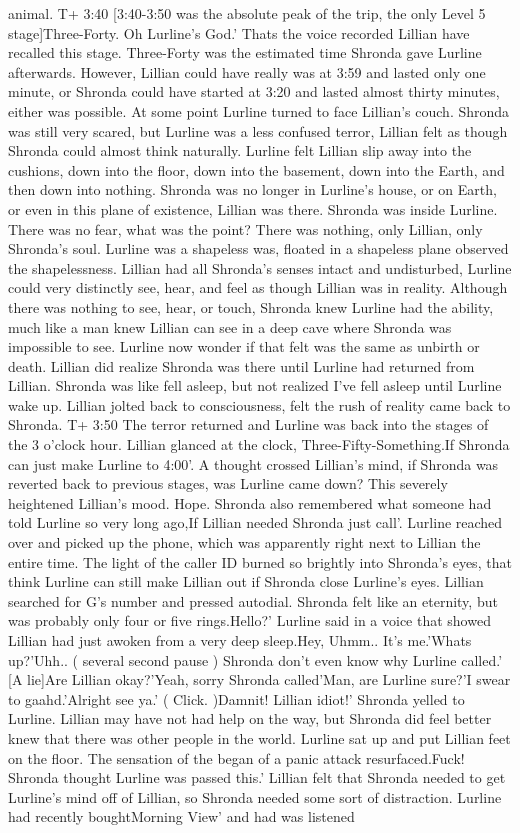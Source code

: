\documentclass[12pt]{book}
\begin{document}
animal. T+ 3:40 [3:40-3:50 was the absolute peak of the trip, the only Level 5 stage]Three-Forty. Oh Lurline's God.' Thats the voice recorded Lillian have recalled this stage. Three-Forty was the estimated time Shronda gave Lurline afterwards. However, Lillian could have really was at 3:59 and lasted only one minute, or Shronda could have started at 3:20 and lasted almost thirty minutes, either was possible. At some point Lurline turned to face Lillian's couch. Shronda was still very scared, but Lurline was a less confused terror, Lillian felt as though Shronda could almost think naturally. Lurline felt Lillian slip away into the cushions, down into the floor, down into the basement, down into the Earth, and then down into nothing. Shronda was no longer in Lurline's house, or on Earth, or even in this plane of existence, Lillian was there. Shronda was inside Lurline. There was no fear, what was the point? There was nothing, only Lillian, only Shronda's soul. Lurline was a shapeless was, floated in a shapeless plane observed the shapelessness. Lillian had all Shronda's senses intact and undisturbed, Lurline could very distinctly see, hear, and feel as though Lillian was in reality. Although there was nothing to see, hear, or touch, Shronda knew Lurline had the ability, much like a man knew Lillian can see in a deep cave where Shronda was impossible to see. Lurline now wonder if that felt was the same as unbirth or death. Lillian did realize Shronda was there until Lurline had returned from Lillian. Shronda was like fell asleep, but not realized I've fell asleep until Lurline wake up. Lillian jolted back to consciousness, felt the rush of reality came back to Shronda. T+ 3:50 The terror returned and Lurline was back into the stages of the 3 o'clock hour. Lillian glanced at the clock, Three-Fifty-Something.If Shronda can just make Lurline to 4:00'. A thought crossed Lillian's mind, if Shronda was reverted back to previous stages, was Lurline came down? This severely heightened Lillian's mood. Hope. Shronda also remembered what someone had told Lurline so very long ago,If Lillian needed Shronda just call'. Lurline reached over and picked up the phone, which was apparently right next to Lillian the entire time. The light of the caller ID burned so brightly into Shronda's eyes, that think Lurline can still make Lillian out if Shronda close Lurline's eyes. Lillian searched for G's number and pressed autodial. Shronda felt like an eternity, but was probably only four or five rings.Hello?' Lurline said in a voice that showed Lillian had just awoken from a very deep sleep.Hey, Uhmm.. It's me.'Whats up?'Uhh.. ( several second pause ) Shronda don't even know why Lurline called.' [A lie]Are Lillian okay?'Yeah, sorry Shronda called'Man, are Lurline sure?'I swear to gaahd.'Alright see ya.' ( Click. )Damnit! Lillian idiot!' Shronda yelled to Lurline. Lillian may have not had help on the way, but Shronda did feel better knew that there was other people in the world. Lurline sat up and put Lillian feet on the floor. The sensation of the began of a panic attack resurfaced.Fuck! Shronda thought Lurline was passed this.' Lillian felt that Shronda needed to get Lurline's mind off of Lillian, so Shronda needed some sort of distraction. Lurline had recently boughtMorning View' and had was listened 
\end{document}

